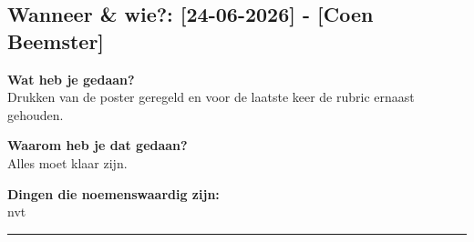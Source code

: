 
\subsection*{Wanneer \& wie?: [24-06-2026] - [Coen Beemster]}

\textbf{Wat heb je gedaan?}\\
Drukken van de poster geregeld en voor de laatste keer de rubric ernaast gehouden.
\vspace{0.3cm} 

\noindent \textbf{Waarom heb je dat gedaan?}\\
Alles moet klaar zijn.

\noindent \textbf{Dingen die noemenswaardig zijn:}\\
nvt


\vspace{0.5cm}
\hrule 
\vspace{0.5cm}
